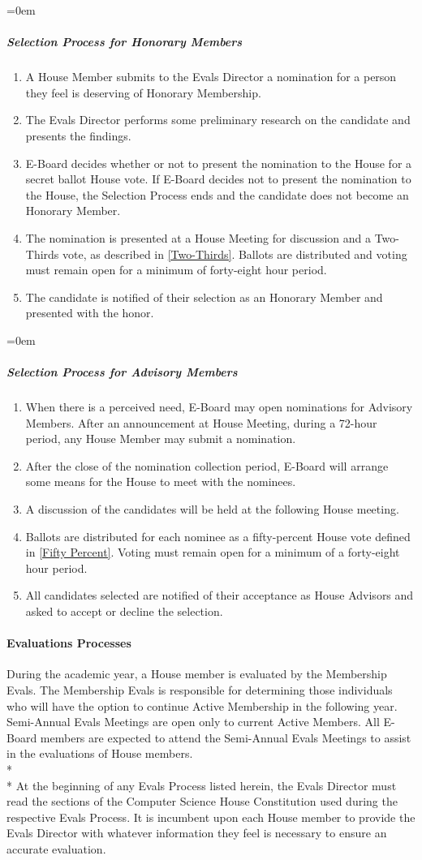 \documentclass{article}
\newcommand{\asubsubsection}[1]{\paragraph{#1} \label{#1}}
\newcommand{\asubsubsubsection}[1]{\parindent=0em\subparagraph{#1} \label{#1}}
\begin{document}
\asubsubsubsection{Selection Process for Honorary Members}
\begin{enumerate}
	\item A House Member submits to the Evals Director a nomination for a person they feel is deserving of Honorary Membership.
	\item The Evals Director performs some preliminary research on the candidate and presents the findings.
	\item E-Board decides whether or not to present the nomination to the House for a secret ballot House vote.
		If E-Board decides not to present the nomination to the House, the Selection Process ends and the candidate does not become an Honorary Member.
	\item The nomination is presented at a House Meeting for discussion and a Two-Thirds vote, as described in \ref{Two-Thirds}.
		Ballots are distributed and voting must remain open for a minimum of forty-eight hour period.
	\item The candidate is notified of their selection as an Honorary Member and presented with the honor.
\end{enumerate}

\asubsubsubsection{Selection Process for Advisory Members}
\begin{enumerate}
	\item When there is a perceived need, E-Board may open nominations for Advisory Members.
		After an announcement at House Meeting, during a 72-hour period, any House Member may submit a nomination.
	\item After the close of the nomination collection period, E-Board will arrange some means for the House to meet with the nominees.
	\item A discussion of the candidates will be held at the following House meeting.
	\item Ballots are distributed for each nominee as a fifty-percent House vote defined in \ref{Fifty Percent}.
		Voting must remain open for a minimum of a forty-eight hour period.
	\item All candidates selected are notified of their acceptance as House Advisors and asked to accept or decline the selection.
\end{enumerate}

\asubsubsection{Evaluations Processes}
During the academic year, a House member is evaluated by the Membership Evals.
The Membership Evals is responsible for determining those individuals who will have the option to continue Active Membership in the following year.
Semi-Annual Evals Meetings are open only to current Active Members.
All E-Board members are expected to attend the Semi-Annual Evals Meetings to assist in the evaluations of House members.
\\* \\*
At the beginning of any Evals Process listed herein, the Evals Director must read the sections of the Computer Science House Constitution used during the respective Evals Process.
It is incumbent upon each House member to provide the Evals Director with whatever information they feel is necessary to ensure an accurate evaluation.
\end{document}
